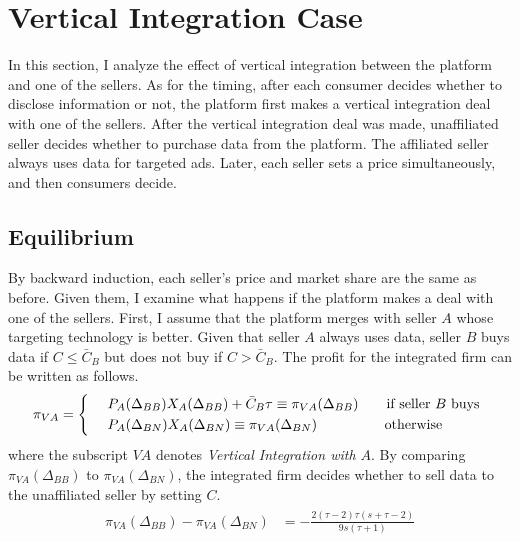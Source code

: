 \documentclass[12pt]{article}
\begin{document}
\section{Vertical Integration Case}
In this section, I analyze the effect of vertical integration between the platform and one of the sellers. As for the timing, after each consumer decides whether to disclose information or not, the platform first makes a vertical integration deal with one of the sellers. After the vertical integration deal was made, unaffiliated seller decides whether to purchase data from the platform. The affiliated seller always uses data for targeted ads. Later, each seller sets a price simultaneously, and then consumers decide. 

\subsection{Equilibrium}
By backward induction, each seller's price and market share are the same as before. Given them, I examine what happens if the platform makes a deal with one of the sellers. First, I assume that the platform merges with seller $A$ whose targeting technology is better. Given that seller $A$ always uses data, seller $B$ buys data if $C\leq\bar{C}_B$ but does not buy if $C>\bar{C}_B$. The profit for the integrated firm can be written as follows. 
\begin{align}
\begin{aligned}
\pi_{VA}=\begin{dcases}
&\,\,  P_A(\Delta_{BB})X_A(\Delta_{BB})+\bar{C}_B\tau\equiv \pi_{VA}(\Delta_{BB})  \quad \quad  \text{if seller $B$ buys }  \\
&\,\,  P_A(\Delta_{BN})X_A(\Delta_{BN}) \equiv \pi_{VA}(\Delta_{BN}) \,\,\,\quad\quad\quad\quad\,\,   \text{otherwise} 
\end{dcases}\end{aligned}
\end{align}
where the subscript $VA$ denotes \textit{Vertical Integration with $A$}. By comparing $\pi_{VA}(\Delta_{BB}) $ to $\pi_{VA}(\Delta_{BN}) $, the integrated firm decides whether to sell data to the unaffiliated seller by setting $C$.  
\begin{align}
\begin{aligned}
\pi_{VA}(\Delta_{BB}) -\pi_{VA}(\Delta_{BN})  &= -\frac{2 (\tau -2) \tau  (s+\tau -2)}{9 s (\tau +1)}\\
\end{aligned}
\end{align}
\end{document}
